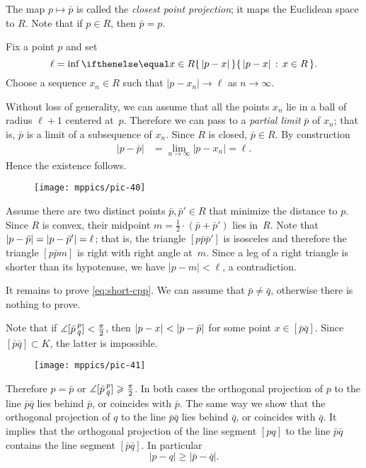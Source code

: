 The map $p\mapsto \bar p$ is called the \label{closest point projection}\emph{closest point projection};
it maps the Euclidean space to $R$.
Note that if $p\in R$, then $\bar p=p$.

Fix a point $p$ and set 
\[\ell=\inf\set{|p-x|}{x\in R}.\]
Choose a sequence $x_n\in R$ such that $|p-x_n|\to \ell$ as $n\to\infty$.

Without loss of generality, we can assume that all the points $x_n$ lie in a ball of radius $\ell+1$ centered at~$p$.
Therefore we can pass to a \emph{partial limit} $\bar p$ of $x_n$; that is, $\bar p$ is a limit of a subsequence of $x_n$.
Since $R$ is closed, $\bar p\in R$.
By construction 
\begin{align*}
|p-\bar p|&=\lim_{n\to\infty}|p-x_n|=\ell.
\end{align*}
Hence the existence follows.

{

\begin{wrapfigure}{r}{22 mm}
\vskip-0mm
\centering
\texttt{[image: mppics/pic-40]}
\vskip-0mm
\end{wrapfigure}

Assume there are two distinct points $\bar p, \bar p'\in R$ that minimize the distance to $p$.
Since $R$ is convex, their midpoint $m=\tfrac12\cdot (\bar p+\bar p')$ lies in~$R$.
Note that $|p-\bar p|\z=|p-\bar p'|=\ell$; that is, the triangle $[p\bar p\bar p']$ is isosceles and therefore the triangle $[p\bar p m]$ is right with  right angle at~$m$.
Since a leg of a right triangle is shorter than its hypotenuse, we have $|p-m|<\ell$, a contradiction. 

It remains to prove \ref{eq:short-cpp}.
We can assume that $\bar p\ne\bar q$, otherwise there is nothing to prove.

}

Note that if $\measuredangle [\bar p\,{}^{p}_{\bar q}]< \tfrac\pi2$, then $\dist{p}{x}{}\z<\dist{p}{\bar p}{}$ for some point $x\in [\bar p\bar q]$.
Since $[\bar p\bar q]\subset K$,
the latter is impossible.

\begin{wrapfigure}{l}{37 mm}
\vskip-0mm
\centering
\texttt{[image: mppics/pic-41]}
\vskip-0mm
\end{wrapfigure}

Therefore $p=\bar p$ or $\measuredangle [\bar p\,{}^{p}_{\bar q}]\geqslant \tfrac\pi2$.
In both cases the orthogonal projection of $p$ to the line $\bar p\bar q$ lies behind $\bar p$, or coincides with $\bar p$.
The same way we show that the orthogonal projection of $q$ to the line $\bar p\bar q$ lies behind $\bar q$, or coincides with $\bar q$.
It implies that the orthogonal projection of the line segment $[pq]$ to the line $\bar p\bar q$ contains the line segment $[\bar p\bar q]$.
In particular 
\[|p-q|\ge |\bar p-\bar q|.\]
\qedsf

